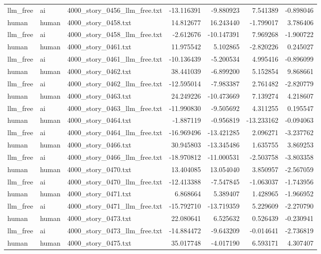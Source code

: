 \begin{longtable}{lllrrrr}
llm\_free & ai & 4000\_story\_0456\_llm\_free.txt & -13.116391 & -9.880923 & 7.541389 & -0.898046 \\
human & human & 4000\_story\_0458.txt & 14.812677 & 16.243440 & -1.799017 & 3.786406 \\
llm\_free & ai & 4000\_story\_0458\_llm\_free.txt & -2.612676 & -10.147391 & 7.969268 & -1.900722 \\
human & human & 4000\_story\_0461.txt & 11.975542 & 5.102865 & -2.820226 & 0.245027 \\
llm\_free & ai & 4000\_story\_0461\_llm\_free.txt & -10.136439 & -5.200534 & 4.995416 & -0.896099 \\
human & human & 4000\_story\_0462.txt & 38.441039 & -6.899200 & 5.152854 & 9.868661 \\
llm\_free & ai & 4000\_story\_0462\_llm\_free.txt & -12.595014 & -7.983387 & 2.761482 & -2.820779 \\
human & human & 4000\_story\_0463.txt & 24.249226 & -10.473669 & 7.139274 & 4.218607 \\
llm\_free & ai & 4000\_story\_0463\_llm\_free.txt & -11.990830 & -9.505692 & 4.311255 & 0.195547 \\
human & human & 4000\_story\_0464.txt & -1.887119 & -0.956819 & -13.233162 & -0.094063 \\
llm\_free & ai & 4000\_story\_0464\_llm\_free.txt & -16.969496 & -13.421285 & 2.096271 & -3.237762 \\
human & human & 4000\_story\_0466.txt & 30.945803 & -13.345486 & 1.635755 & 3.869253 \\
llm\_free & ai & 4000\_story\_0466\_llm\_free.txt & -18.970812 & -11.000531 & -2.503758 & -3.803358 \\
human & human & 4000\_story\_0470.txt & 13.404085 & 13.054040 & 3.850957 & -2.567059 \\
llm\_free & ai & 4000\_story\_0470\_llm\_free.txt & -12.413388 & -7.547845 & -1.063037 & -1.743956 \\
human & human & 4000\_story\_0471.txt & 6.868664 & 5.389407 & 1.428965 & -1.966952 \\
llm\_free & ai & 4000\_story\_0471\_llm\_free.txt & -15.792710 & -13.719359 & 5.229609 & -2.270790 \\
human & human & 4000\_story\_0473.txt & 22.080641 & 6.525632 & 0.526439 & -0.230941 \\
llm\_free & ai & 4000\_story\_0473\_llm\_free.txt & -14.884472 & -9.643209 & -0.014641 & -2.736819 \\
human & human & 4000\_story\_0475.txt & 35.017748 & -4.017190 & 6.593171 & 4.307407 \\

\end{longtable}
